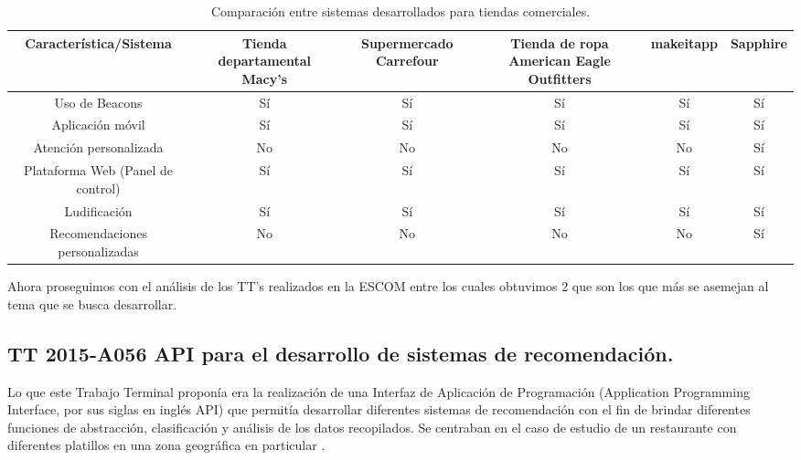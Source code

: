 \FloatBarrier
\begin{table}[htb]
\setlength\extrarowheight{2pt} %
\begin{tabularx}{\textwidth}{|C|C|C|C|C|C|}
\hline
\textbf{Característica/Sistema} & \textbf{Tienda departamental Macy's} & \textbf{Supermercado Carrefour} & \textbf{Tienda de ropa American Eagle Outfitters} & \textbf{makeitapp} & \textbf{Sapphire} \\\hline
Uso de Beacons & Sí & Sí & Sí & Sí & Sí \\ \hline
Aplicación móvil & Sí & Sí & Sí & Sí & Sí \\ \hline
Atención personalizada & No & No & No & No & Sí \\ \hline
Plataforma Web (Panel de control) & Sí & Sí & Sí & Sí & Sí \\ \hline
Ludificación & Sí & Sí & Sí & Sí & Sí \\ \hline
Recomendaciones personalizadas & No & No & No & No & Sí \\ \hline
\end{tabularx}
\caption{Comparación entre sistemas desarrollados para tiendas comerciales.}
\label{table:sistemascomercialesapps}
\end{table}
\FloatBarrier
Ahora proseguimos con el análisis de los TT's realizados en la ESCOM entre los cuales obtuvimos 2 que son los que más se asemejan al tema que se busca desarrollar.
\\ \par
\subsection{TT 2015-A056 API para el desarrollo de sistemas de recomendación.}
Lo que este Trabajo Terminal proponía era la realización de una Interfaz de Aplicación de Programación (Application Programming Interface, por sus siglas en inglés API) que permitía desarrollar diferentes sistemas de recomendación con el fin de brindar diferentes funciones de abstracción, clasificación y análisis de los datos recopilados. Se centraban en el caso de estudio de un restaurante con diferentes platillos en una zona geográfica en particular \cite{API}.
\\ \par
